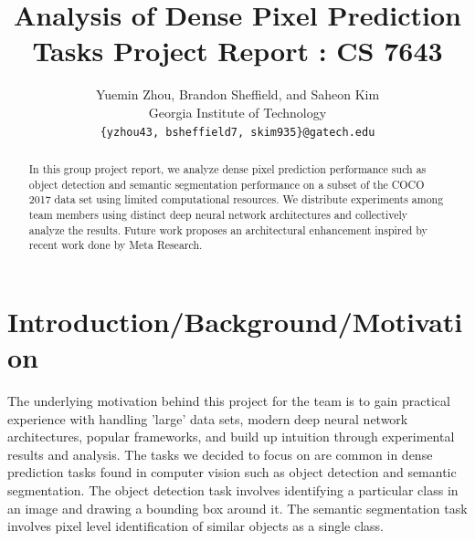 \documentclass[10pt,twocolumn,letterpaper]{article}
\begin{document}
\title{Analysis of Dense Pixel Prediction Tasks Project Report : CS 7643}

\author{Yuemin Zhou, Brandon Sheffield, and Saheon Kim \\
Georgia Institute of Technology\\
{\tt\small \{yzhou43, bsheffield7, skim935\}@gatech.edu}
}

\maketitle

\begin{abstract}
   In this group project report, we analyze dense pixel prediction performance such as object detection and semantic segmentation performance on a subset of the COCO 2017 data set using limited computational resources. We distribute experiments among team members using distinct deep neural network architectures and collectively analyze the results. Future work proposes an architectural enhancement inspired by recent work done by Meta Research.
\end{abstract}

\section{Introduction/Background/Motivation}


The underlying motivation behind this project for the team is to gain practical experience with handling 'large' data sets, modern deep neural network architectures, popular frameworks, and build up intuition through experimental results and analysis. The tasks we decided to focus on are common in dense prediction tasks\cite{vandenhende2021multi} found in computer vision such as object detection\cite{zaidi2022survey} and semantic segmentation\cite{lateef2019survey}. The object detection task involves identifying a particular class in an image and drawing a bounding box around it. The semantic segmentation task involves pixel level identification of similar objects as a single class.
\end{document}
